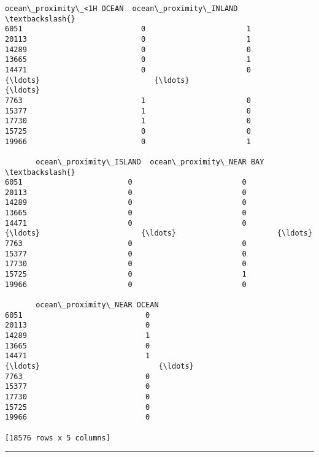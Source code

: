 \documentclass[11pt]{article}
\makeatletter
\newcommand{\boxspacing}{\kern\kvtcb@left@rule\kern\kvtcb@boxsep}
\newcommand{\prompt}[4]{
        {\ttfamily\llap{{\color{#2}[#3]:\hspace{3pt}#4}}\vspace{-\baselineskip}}
    }
\makeatother
\begin{document}
            \begin{tcolorbox}[breakable, size=fbox, boxrule=.5pt, pad at break*=1mm, opacityfill=0]
\prompt{Out}{outcolor}{60}{\boxspacing}
\begin{Verbatim}[commandchars=\\\{\}]
       ocean\_proximity\_<1H OCEAN  ocean\_proximity\_INLAND  \textbackslash{}
6051                           0                       1
20113                          0                       1
14289                          0                       0
13665                          0                       1
14471                          0                       0
{\ldots}                          {\ldots}                     {\ldots}
7763                           1                       0
15377                          1                       0
17730                          1                       0
15725                          0                       0
19966                          0                       1

       ocean\_proximity\_ISLAND  ocean\_proximity\_NEAR BAY  \textbackslash{}
6051                        0                         0
20113                       0                         0
14289                       0                         0
13665                       0                         0
14471                       0                         0
{\ldots}                       {\ldots}                       {\ldots}
7763                        0                         0
15377                       0                         0
17730                       0                         0
15725                       0                         1
19966                       0                         0

       ocean\_proximity\_NEAR OCEAN
6051                            0
20113                           0
14289                           1
13665                           0
14471                           1
{\ldots}                           {\ldots}
7763                            0
15377                           0
17730                           0
15725                           0
19966                           0

[18576 rows x 5 columns]
\end{Verbatim}
\end{tcolorbox}
        
    \begin{center}\rule{0.5\linewidth}{0.5pt}\end{center}
\end{document}
